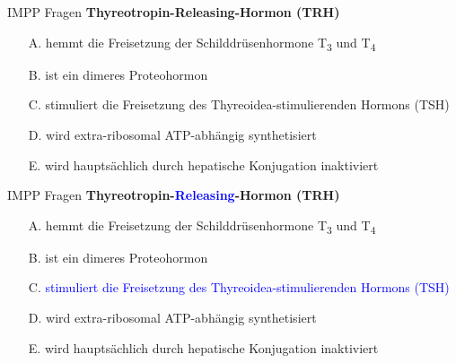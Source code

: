 \documentclass{beamer}
\begin{document}
\begin{frame}{IMPP Fragen}
\textbf{
Thyreotropin-Releasing-Hormon (TRH)} \\[0.2 cm]

\begin{itemize}
\item[A.] hemmt die Freisetzung der Schilddrüsenhormone T\textsubscript{3} und T\textsubscript{4}
\item[B.] ist ein dimeres Proteohormon
\item[C.] stimuliert die Freisetzung des Thyreoidea-stimulierenden Hormons (TSH) %
\item[D.] wird extra-ribosomal ATP-abhängig synthetisiert
\item[E.] wird hauptsächlich durch hepatische Konjugation inaktiviert 

\end{itemize}
    
\end{frame}

\begin{frame}{IMPP Fragen}
\textbf{
Thyreotropin-\textcolor{blue}{Releasing}-Hormon (TRH)} \\[0.2 cm]

\begin{itemize}
\item[A.] hemmt die Freisetzung der Schilddrüsenhormone T\textsubscript{3} und T\textsubscript{4}
\item[B.] ist ein dimeres Proteohormon
\item[C.] \textcolor{blue}{stimuliert die Freisetzung des Thyreoidea-stimulierenden Hormons (TSH)} %
\item[D.] wird extra-ribosomal ATP-abhängig synthetisiert
\item[E.] wird hauptsächlich durch hepatische Konjugation inaktiviert 

\end{itemize}
    
\end{frame}
\end{document}
